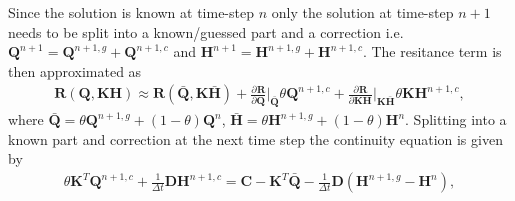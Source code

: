 \documentclass[12pt]{article}
\newcommand{\pardiv}[3]{\frac{\partial^{#1} #2}{\partial #3^{#1}}}
\begin{document}
Since the solution is known at time-step $n$ only the solution at time-step $n+1$ needs to be split into a known/guessed part and a correction i.e. $\mathbf{Q}^{n+1} = \mathbf{Q}^{n+1,g} + \mathbf{Q}^{n+1,c}$ and $\mathbf{H}^{n+1} = \mathbf{H}^{n+1,g} + \mathbf{H}^{n+1,c}$. The resitance term is then approximated as {\color{green}
\begin{align*}
\mathbf{R}(\mathbf{Q}, \mathbf{K} \mathbf{H}) \approx \mathbf{R}\left(\bar{\mathbf{Q}}, \mathbf{K} \bar{\mathbf{H}} \right) + \pardiv{}{\mathbf{R}}{\mathbf{Q}} \Bigg\vert_{\bar{\mathbf{Q}}} \theta \mathbf{Q}^{n+1,c} + \pardiv{}{\mathbf{R}}{\mathbf{K} \mathbf{H}} \Bigg\vert_{\mathbf{K} \bar{\mathbf{H}}} \theta \mathbf{K} \mathbf{H}^{n+1,c},
\end{align*}
where $\bar{\mathbf{Q}}=\theta \mathbf{Q}^{n+1,g} + (1-\theta) \mathbf{Q}^{n}$, $\bar{\mathbf{H}}=\theta \mathbf{H}^{n+1,g} + (1-\theta) \mathbf{H}^{n}$.} Splitting into a known part and correction at the next time step the continuity equation is given by
\begin{align}\label{discrete_transient_continuity_eqn_newton}
\theta \mathbf{K}^T \mathbf{Q}^{n+1,c} + \frac{1}{\Delta t} \mathbf{D} \mathbf{H}^{n+1,c} = \mathbf{C} - \mathbf{K}^T \bar{\mathbf{Q}} - \frac{1}{\Delta t} \mathbf{D} \left( \mathbf{H}^{n+1,g} - \mathbf{H}^{n} \right),
\end{align}
\end{document}
